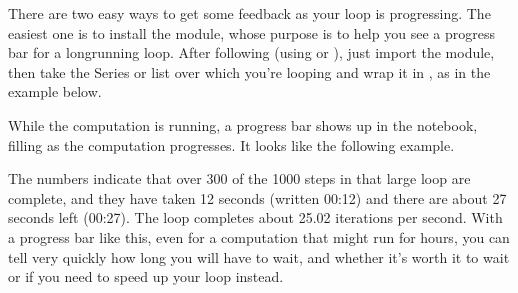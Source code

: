 \documentclass[letterpaper,10pt,english]{sphinxmanual}
\begin{document}
There are two easy ways to get some feedback as your loop is progressing.  The easiest one is to install the  module, whose purpose is to help you see a progress bar for a long\sphinxhyphen{}running loop.  After following  (using  or ), just import the module, then take the Series or list over which you’re looping and wrap it in , as in the example below.

\begin{sphinxVerbatim}[commandchars=\\\{\}]
   

  \PYG{p}{[} \PYG{p}{]}
    \PYG{p}{[}\PYG{p}{]}    
     \PYG{p}{[}\PYG{p}{]}  \PYG{p}{[}\PYG{p}{]}  \PYGZbs{}
       \PYG{p}{[}\PYG{p}{]}  \PYG{p}{[}\PYG{p}{]}
          
\PYG{p}{[}\PYG{p}{]}
\end{sphinxVerbatim}

While the computation is running, a progress bar shows up in the notebook, filling as the computation progresses.  It looks like the following example.


The numbers indicate that over 300 of the 1000 steps in that large loop are complete, and they have taken 12 seconds (written 00:12) and there are about 27 seconds left (00:27).  The loop completes about 25.02 iterations per second.  With a progress bar like this, even for a computation that might run for hours, you can tell very quickly how long you will have to wait, and whether it’s worth it to wait or if you need to speed up your loop instead.
\end{document}

